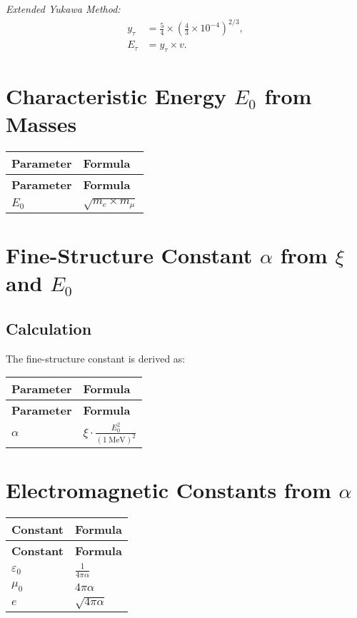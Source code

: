 \documentclass[12pt,a4paper]{article}
\begin{document}
	\textit{Extended Yukawa Method:}
	\begin{align}
		y_\tau &= \frac{5}{4} \times \left(\frac{4}{3} \times 10^{-4}\right)^{2/3}, \\
		E_\tau &= y_\tau \times v.
	\end{align}
	
	\section{Characteristic Energy $E_0$ from Masses}
	\begin{longtable}{|p{5cm}|p{6cm}|}
		\hline
		\textbf{Parameter} & \textbf{Formula} \\
		\hline
		\endfirsthead
		\hline
		\textbf{Parameter} & \textbf{Formula} \\
		\hline
		\endhead
		$E_0$ & $\sqrt{m_e \times m_{\mu}}$ \\
		\hline
	\end{longtable}
	
	\section{Fine-Structure Constant $\alpha$ from $\xi$ and $E_0$}
	\subsection{Calculation}
	The fine-structure constant is derived as:
	\begin{longtable}{|p{5cm}|p{6cm}|}
		\hline
		\textbf{Parameter} & \textbf{Formula} \\
		\hline
		\endfirsthead
		\hline
		\textbf{Parameter} & \textbf{Formula} \\
		\hline
		\endhead
		$\alpha$ & $\xi \cdot \frac{E_0^2}{(1~\mathrm{MeV})^2}$ \\
		\hline
	\end{longtable}
	
	\section{Electromagnetic Constants from $\alpha$}
	\begin{longtable}{|p{5cm}|p{6cm}|}
		\hline
		\textbf{Constant} & \textbf{Formula} \\
		\hline
		\endfirsthead
		\hline
		\textbf{Constant} & \textbf{Formula} \\
		\hline
		\endhead
		$\varepsilon_0$ & $\frac{1}{4\pi\alpha}$ \\
		\hline
		$\mu_0$ & $4\pi\alpha$ \\
		\hline
		$e$ & $\sqrt{4\pi\alpha}$ \\
		\hline
	\end{longtable}
	
\end{document}
